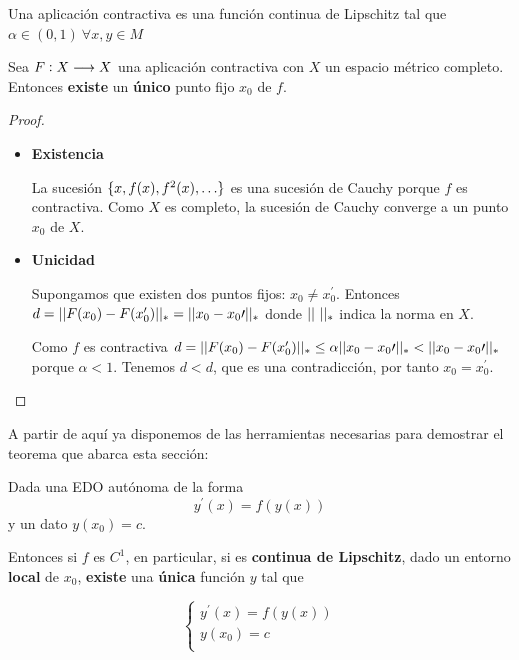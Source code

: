 \documentclass{mathnotes}
\begin{document}
\begin{definition}
Una aplicación contractiva es una función continua de Lipschitz tal que $\alpha \in (0,1)\ \forall x,y\in M$
\end{definition}

\begin{theorem}
Sea $F: X \longrightarrow X$ una aplicación contractiva con $X$ un espacio métrico completo. Entonces \textbf{existe} un \textbf{único} punto fijo $x_0$ de $f$. 
\end{theorem}
\begin{proof}
\begin{itemize}
\item \textbf{Existencia}

La sucesión $\{ x, f(x), f^2(x), \hdots \}$ es una sucesión de Cauchy porque $f$ es contractiva. Como $X$ es completo, la sucesión de Cauchy converge a un punto $x_0$ de $X$.

\item \textbf{Unicidad}

Supongamos que existen dos puntos fijos: $x_0 \neq x_0^\prime$. Entonces $d = ||F(x_0)-F(x_0^\prime)||_* = ||x_0-x_0\prime||_*$ donde $\norm{\ }_*$ indica la norma en $X$.

Como $f$ es contractiva $d = ||F(x_0)-F(x_0^\prime)||_* \leq \alpha||x_0-x_0\prime||_* < ||x_0-x_0\prime||_*$ porque $\alpha < 1$. Tenemos $d\lt d$, que es una contradicción, por tanto $x_0 = x_0^\prime$.
\end{itemize}
\end{proof}

A partir de aquí ya disponemos de las herramientas necesarias para demostrar el teorema que abarca esta sección:

\begin{theorem}
Dada una EDO autónoma de la forma 
$$
y^\prime(x) = f(y(x))
$$
y un dato $y(x_0) = c$. 

Entonces si $f$ es $C^1$, en particular, si es \textbf{continua de Lipschitz}, dado un entorno \textbf{local} de $x_0$, \textbf{existe} una \textbf{única} función $y$ tal que

$$
\left\lbrace
  \begin{array}{l}
     y^\prime(x) = f(y(x)) \\
     y(x_0) = c  \\
  \end{array}
  \right.
$$
\end{theorem}
\end{document}
